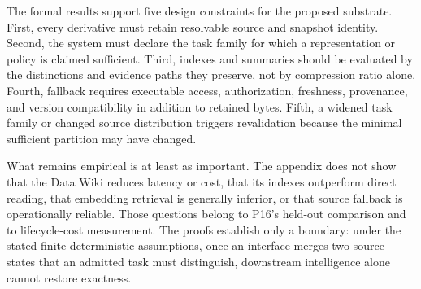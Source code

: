 \documentclass[11pt]{article}
\begin{document}
The formal results support five design constraints for the proposed substrate. First, every derivative must retain resolvable source and snapshot identity. Second, the system must declare the task family for which a representation or policy is claimed sufficient. Third, indexes and summaries should be evaluated by the distinctions and evidence paths they preserve, not by compression ratio alone. Fourth, fallback requires executable access, authorization, freshness, provenance, and version compatibility in addition to retained bytes. Fifth, a widened task family or changed source distribution triggers revalidation because the minimal sufficient partition may have changed.

What remains empirical is at least as important. The appendix does not show that the Data Wiki reduces latency or cost, that its indexes outperform direct reading, that embedding retrieval is generally inferior, or that source fallback is operationally reliable. Those questions belong to P16's held-out comparison and to lifecycle-cost measurement. The proofs establish only a boundary: under the stated finite deterministic assumptions, once an interface merges two source states that an admitted task must distinguish, downstream intelligence alone cannot restore exactness.



\end{document}
